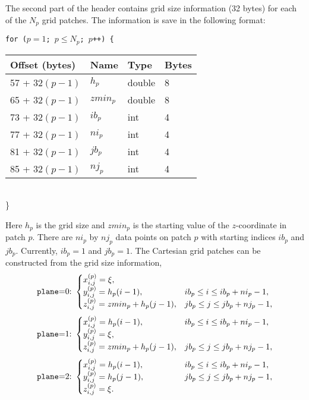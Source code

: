 \documentclass[11pt]{report}
\begin{document}
The second part of the header contains grid size information (32 bytes)
for each of the $N_p$ grid patches. The information is save in the following format:
{\samepage
\begin{flushleft}
{\tt for ($p=1$; $p\leq N_p$; $p$++) \{}\nopagebreak \\ 
\hspace{5mm}
\begin{tabular}{llll}\hline
Offset (bytes) & Name & Type & Bytes \\ \hline
57 + $32(p - 1)$ & $h_{p}$ & double & 8 \\ \hline
65 + $32(p - 1)$ & $zmin_{p}$ & double & 8 \\ \hline
73 + $32(p - 1)$ & $ib_{p}$ & int & 4 \\ \hline
77 + $32(p - 1)$ & $ni_{p}$ & int & 4 \\ \hline
81 + $32(p - 1)$ & $jb_{p}$ & int & 4 \\ \hline
85 + $32(p - 1)$ & $nj_{p}$ & int & 4 \\ \hline
\end{tabular}\\
\}
\end{flushleft}
}
Here $h_p$ is the grid size and $zmin_p$ is the starting value of the $z$-coordinate in patch
$p$. There are $ni_p$ by $nj_p$ data points on patch $p$ with starting indices $ib_p$ and
$jb_p$. Currently, $ib_p=1$ and $jb_p=1$. The Cartesian grid patches can be constructed from the
grid size information,
\[
\mbox{{\tt plane}=0:}\ \begin{cases}
x^{(p)}_{i,j} = \xi,\\
y^{(p)}_{i,j} = h_p(i-1),& ib_p\leq i\leq ib_p+ni_p-1,\\
z^{(p)}_{i,j} = zmin_p + h_p(j-1),& jb_p\leq j\leq jb_p+nj_p-1,
\end{cases}
\]
\[
\mbox{{\tt plane}=1:}\ \begin{cases}
x^{(p)}_{i,j} = h_p(i-1),& ib_p\leq i\leq ib_p+ni_p-1,\\
y^{(p)}_{i,j} = \xi,\\
z^{(p)}_{i,j} = zmin_p + h_p(j-1),& jb_p\leq j\leq jb_p+nj_p-1,
\end{cases}
\]
\[
\mbox{{\tt plane}=2:}\ \begin{cases}
x^{(p)}_{i,j} = h_p(i-1),& \qquad \qquad ib_p\leq i\leq ib_p+ni_p-1, \\
y^{(p)}_{i,j} = h_p(j-1),& \qquad \qquad jb_p\leq j\leq jb_p+nj_p-1, \\
z^{(p)}_{i,j} = \xi.
\end{cases}
\]
\end{document}
